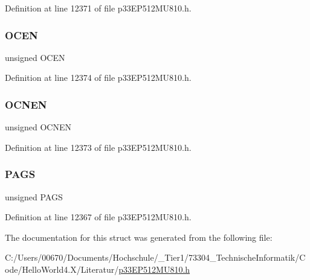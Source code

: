 Definition at line 12371 of file p33\+E\+P512\+M\+U810.\+h.

\mbox{\label{structtag_c_m1_m_s_k_c_o_n_b_i_t_s_ad7c118cfef34dec7ba06f5968b47200c}} 
\subsubsection{\texorpdfstring{O\+C\+EN}{OCEN}}
{\footnotesize\ttfamily unsigned O\+C\+EN}



Definition at line 12374 of file p33\+E\+P512\+M\+U810.\+h.

\mbox{\label{structtag_c_m1_m_s_k_c_o_n_b_i_t_s_a8bee27f84106873154bb0f1b9d244ebd}} 
\subsubsection{\texorpdfstring{O\+C\+N\+EN}{OCNEN}}
{\footnotesize\ttfamily unsigned O\+C\+N\+EN}



Definition at line 12373 of file p33\+E\+P512\+M\+U810.\+h.

\mbox{\label{structtag_c_m1_m_s_k_c_o_n_b_i_t_s_af5feed07d2e415c635200336f0f05e41}} 
\subsubsection{\texorpdfstring{P\+A\+GS}{PAGS}}
{\footnotesize\ttfamily unsigned P\+A\+GS}



Definition at line 12367 of file p33\+E\+P512\+M\+U810.\+h.



The documentation for this struct was generated from the following file\+:\begin{DoxyCompactItemize}
\item 
C\+:/\+Users/00670/\+Documents/\+Hochschule/\+\_\+\+Tier1/73304\+\_\+\+Technische\+Informatik/\+Code/\+Hello\+World4.\+X/\+Literatur/\hyperlink{p33_e_p512_m_u810_8h}{p33\+E\+P512\+M\+U810.\+h}\end{DoxyCompactItemize}

